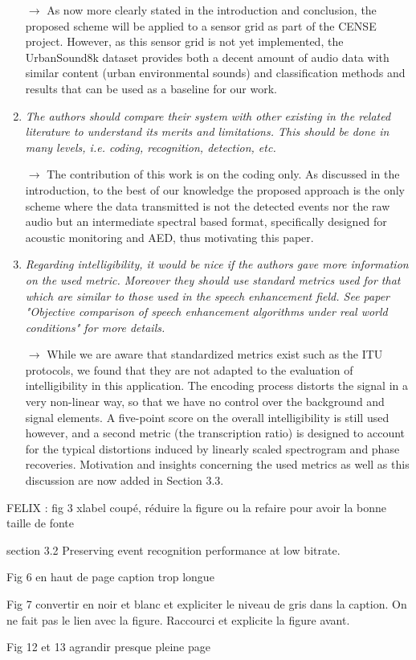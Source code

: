 \documentclass[10pt]{article}
\begin{document}
\begin{enumerate}
$\rightarrow$ As now more clearly stated in the introduction and conclusion, the proposed scheme will be applied to a sensor grid as part of the CENSE project. However, as this sensor grid is not yet implemented, the UrbanSound8k dataset provides both a decent amount of audio data with similar content (urban environmental sounds) and classification methods and results that can be used as a baseline for our work.

\item \emph{The authors should compare their system with other existing in the related literature to understand its merits and limitations. This should be done in many levels, i.e. coding, recognition, detection, etc.}

$\rightarrow$ The contribution of this work is on the coding only. As discussed in the introduction, to the best of our knowledge the proposed approach is the only scheme where the data transmitted is not the detected events nor the raw audio but an intermediate spectral based format, specifically designed for acoustic monitoring and AED, thus motivating this paper.

\item \emph{Regarding intelligibility, it would be nice if the authors gave more information on the used metric. Moreover they should use standard metrics used for that which are similar to those used in the speech enhancement field. See paper "Objective comparison of speech enhancement algorithms under real world conditions" for more details.}

$\rightarrow$ While we are aware that standardized metrics exist such as the ITU protocols, we found that they are not adapted to the evaluation of intelligibility in this application. The encoding process distorts the signal in a very non-linear way, so that we have no control over the background and signal elements. A five-point score on the overall intelligibility is still used however, and a second metric (the transcription ratio) is designed to account for the typical distortions induced by linearly scaled spectrogram and phase recoveries. Motivation and insights concerning the used metrics as well as this discussion are now added in Section 3.3.

\end{enumerate}

FELIX : fig 3 xlabel coupé, réduire la figure ou la refaire pour avoir la bonne taille de fonte

section 3.2 Preserving event recognition performance at low bitrate.

Fig 6 en haut de page caption trop longue

Fig 7 convertir en noir et blanc et expliciter le niveau de gris dans la caption. On ne fait pas le lien avec la figure. Raccourci et explicite la figure avant.

Fig 12 et 13 agrandir presque pleine page
\end{document}
